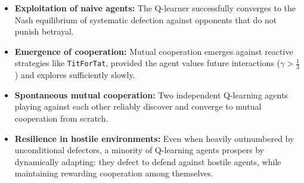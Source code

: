 \documentclass[11pt, a4paper]{article}
\begin{document}
\begin{itemize}
    \item \textbf{Exploitation of naive agents:} The Q-learner successfully converges to the Nash equilibrium of systematic defection against opponents that do not punish betrayal.
    \item \textbf{Emergence of cooperation:} Mutual cooperation emerges against reactive strategies like \texttt{TitForTat}, provided the agent values future interactions ($\gamma > \frac{1}{3}$) and explores sufficiently slowly.
    \item \textbf{Spontaneous mutual cooperation:} Two independent Q-learning agents playing against each other reliably discover and converge to mutual cooperation from scratch.
    \item \textbf{Resilience in hostile environments:} Even when heavily outnumbered by unconditional defectors, a minority of Q-learning agents prospers by dynamically adapting: they defect to defend against hostile agents, while maintaining rewarding cooperation among themselves.
\end{itemize}

\newpage

\end{document}
